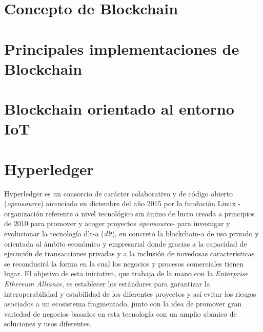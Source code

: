 \documentclass[12pt,a4paper, twoside]{report}
\begin{document}
	\section{Concepto de Blockchain}
	
	\section{Principales implementaciones de Blockchain}
		
	\section{Blockchain orientado al entorno IoT}
	
		
	\section{Hyperledger}
	
	Hyperledger es un consorcio de carácter colaborativo y de código abierto (\textit{\gls{opensource}}) anunciado en diciembre del año 2015 por la fundación Linux -organización referente a nivel tecnológico sin ánimo de lucro creada a principios de 2010 para promover y acoger proyectos \textit{\gls{opensource}}- para investigar y evolucionar la tecnología \gls{dlt-a} (\textit{\gls{dlt}}), en concreto la \gls{blockchain-a} de uso privado y orientada al ámbito económico y empresarial donde gracias a la capacidad de ejecución de transacciones privadas y a la inclusión de novedosas características se reconducirá la forma en la cual los negocios y procesos comerciales tienen lugar. El objetivo de esta iniciativa, que trabaja de la mano con la \textit{Enterprise Ethereum Alliance}, es establecer los estándares para garantizar la interoperabilidad y estabilidad de los diferentes proyectos y así evitar  los riesgos asociados a un ecosistema fragmentado, junto con la idea de promover gran variedad de negocios basados en esta tecnología con un amplio abanico de soluciones y usos diferentes. \\
	 		
\end{document}
